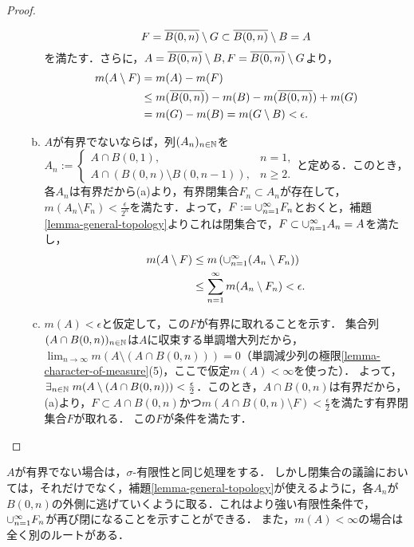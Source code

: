 \documentclass[uplatex, dvipdfmx]{jsreport}
\begin{document}
\begin{proof}
\begin{enumerate}
\begin{enumerate}[(a)]
            \[F=\overline{B(0,n)}\setminus G\subset\overline{B(0,n)}\setminus B=A\]
            を満たす．さらに，$A=\overline{B(0,n)}\setminus B,F=\overline{B(0,n)}\setminus G$より，
            \begin{align*}
                m(A\setminus F)&=m(A)-m(F)\\
                &\le m(\overline{B(0,n)})-m(B)-m(\overline{B(0,n)})+m(G)\\
                &=m(G)-m(B)=m(G\setminus B)<\epsilon.
            \end{align*}
            \item $A$が有界でないならば，列$(A_n)_{n\in\mathbb{N}}$を$A_n:=\begin{cases}
                A\cap B(0,1),&n=1,\\
                A\cap (B(0,n)\setminus B(0,n-1)),&n\ge 2.
            \end{cases}$と定める．このとき，各$A_n$は有界だから(a)より，有界閉集合$F_n\subset A_n$が存在して，$m(A_n\setminus F_n)<\frac{\epsilon}{2^n}$を満たす．よって，$F:=\cup_{n=1}^\infty F_n$とおくと，補題\ref{lemma-general-topology}よりこれは閉集合で，$F\subset\cup_{n=1}^\infty A_n=A$を満たし，
            \begin{align*}
                m(A\setminus F)&\le m\left(\cup_{n=1}^\infty(A_n\setminus F_n)\right)\\
                &\le\sum_{n=1}^\infty m(A_n\setminus F_n)<\epsilon.
            \end{align*}
            \item $m(A)<\epsilon$と仮定して，この$F$が有界に取れることを示す．
            集合列$(A\cap B(0,n))_{n\in\mathbb{N}}$は$A$に収束する単調増大列だから，$\lim_{n\to\infty}m(A\setminus(A\cap B(0,n)))=0$（単調減少列の極限\ref{lemma-character-of-measure}(5)，ここで仮定$m(A)<\infty$を使った）．
            よって，$\exists_{n\in\mathbb{N}}\;m(A\setminus (A\cap B(0,n)))<\frac{\epsilon}{2}$．このとき，$A\cap B(0,n)$は有界だから，(a)より，$F\subset A\cap B(0,n)$かつ$m(A\cap B(0,n)\setminus F)<\frac{\epsilon}{2}$を満たす有界閉集合$F$が取れる．
            この$F$が条件を満たす．
        \end{enumerate}
    \end{enumerate}
\end{proof}
\begin{remarks}
    $A$が有界でない場合は，$\sigma$-有限性と同じ処理をする．
    しかし閉集合の議論においては，それだけでなく，補題\ref{lemma-general-topology}が使えるように，各$A_n$が$B(0,n)$の外側に逃げていくように取る．これはより強い有限性条件で，$\cup_{n=1}^\infty F_n$が再び閉になることを示すことができる．
    また，$m(A)<\infty$の場合は全く別のルートがある．
\end{remarks}
\end{document}
